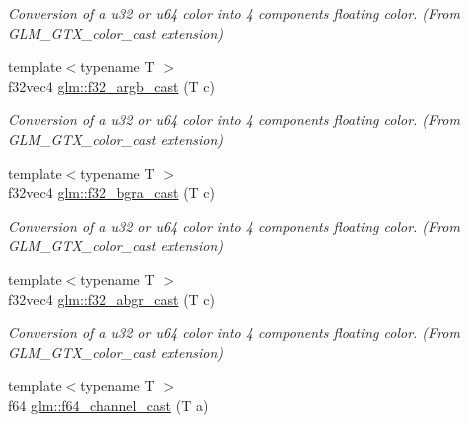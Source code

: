 \begin{DoxyCompactItemize}
\begin{DoxyCompactList}\small\item\em Conversion of a u32 or u64 color into 4 components floating color. (From G\+L\+M\+\_\+\+G\+T\+X\+\_\+color\+\_\+cast extension) \end{DoxyCompactList}\item 
\hypertarget{group__gtx__color__cast_ga1bb6ca4504a27fb918140e098735e023}{}{\footnotesize template$<$typename T $>$ }\\f32vec4 \hyperlink{group__gtx__color__cast_ga1bb6ca4504a27fb918140e098735e023}{glm\+::f32\+\_\+argb\+\_\+cast} (T c)\label{group__gtx__color__cast_ga1bb6ca4504a27fb918140e098735e023}

\begin{DoxyCompactList}\small\item\em Conversion of a u32 or u64 color into 4 components floating color. (From G\+L\+M\+\_\+\+G\+T\+X\+\_\+color\+\_\+cast extension) \end{DoxyCompactList}\item 
\hypertarget{group__gtx__color__cast_gacaa5659ed88420e742b53557dc016e5d}{}{\footnotesize template$<$typename T $>$ }\\f32vec4 \hyperlink{group__gtx__color__cast_gacaa5659ed88420e742b53557dc016e5d}{glm\+::f32\+\_\+bgra\+\_\+cast} (T c)\label{group__gtx__color__cast_gacaa5659ed88420e742b53557dc016e5d}

\begin{DoxyCompactList}\small\item\em Conversion of a u32 or u64 color into 4 components floating color. (From G\+L\+M\+\_\+\+G\+T\+X\+\_\+color\+\_\+cast extension) \end{DoxyCompactList}\item 
\hypertarget{group__gtx__color__cast_ga09b4c27c802a4b5d0e856cc93d16cf2a}{}{\footnotesize template$<$typename T $>$ }\\f32vec4 \hyperlink{group__gtx__color__cast_ga09b4c27c802a4b5d0e856cc93d16cf2a}{glm\+::f32\+\_\+abgr\+\_\+cast} (T c)\label{group__gtx__color__cast_ga09b4c27c802a4b5d0e856cc93d16cf2a}

\begin{DoxyCompactList}\small\item\em Conversion of a u32 or u64 color into 4 components floating color. (From G\+L\+M\+\_\+\+G\+T\+X\+\_\+color\+\_\+cast extension) \end{DoxyCompactList}\item 
\hypertarget{group__gtx__color__cast_ga714d21da59a01f931e5007c089d9f91c}{}{\footnotesize template$<$typename T $>$ }\\f64 \hyperlink{group__gtx__color__cast_ga714d21da59a01f931e5007c089d9f91c}{glm\+::f64\+\_\+channel\+\_\+cast} (T a)\label{group__gtx__color__cast_ga714d21da59a01f931e5007c089d9f91c}


\end{DoxyCompactItemize}
